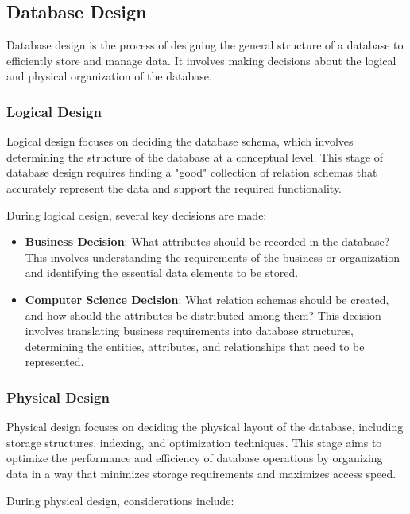 \documentclass{article}
\begin{document}
\subsection*{Database Design}

Database design is the process of designing the general structure of a database to efficiently store and manage data. It involves making decisions about the logical and physical organization of the database.

\subsubsection*{Logical Design}

Logical design focuses on deciding the database schema, which involves determining the structure of the database at a conceptual level. This stage of database design requires finding a "good" collection of relation schemas that accurately represent the data and support the required functionality.

During logical design, several key decisions are made:

\begin{itemize}
    \item \textbf{Business Decision}: What attributes should be recorded in the database? This involves understanding the requirements of the business or organization and identifying the essential data elements to be stored.
    
    \item \textbf{Computer Science Decision}: What relation schemas should be created, and how should the attributes be distributed among them? This decision involves translating business requirements into database structures, determining the entities, attributes, and relationships that need to be represented.
\end{itemize}

\subsubsection*{Physical Design}

Physical design focuses on deciding the physical layout of the database, including storage structures, indexing, and optimization techniques. This stage aims to optimize the performance and efficiency of database operations by organizing data in a way that minimizes storage requirements and maximizes access speed.

During physical design, considerations include:
\end{document}

